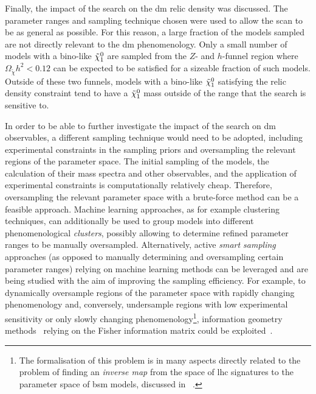 Finally, the impact of the \onelepton search on the \gls{dm} relic density was discussed. The parameter ranges and sampling technique chosen were used to allow the scan to be as general as possible. For this reason, a large fraction of the models sampled are not directly relevant to the \gls{dm} phenomenology. Only a small number of models with a bino-like $\tilde{\chi}_1^0$ are sampled from the $Z$- and $h$-funnel region where $\Omega_{\tilde{\chi}} h^2 < 0.12$ can be expected to be satisfied for a sizeable fraction of such models. Outside of these two funnels, models with a bino-like $\tilde{\chi}_1^0$ satisfying the relic density constraint tend to have a $\tilde{\chi}_1^0$ mass outside of the range that the \onelepton search is sensitive to. 

In order to be able to further investigate the impact of the \onelepton search on \gls{dm} observables, a different sampling technique would need to be adopted, including experimental constraints in the sampling priors and oversampling the relevant regions of the parameter space.
The initial sampling of the models, the calculation of their mass spectra and other observables, and the application of experimental constraints is computationally relatively cheap. Therefore, oversampling the relevant parameter space with a brute-force method can be a feasible approach.
Machine learning approaches, as for example clustering techniques, can additionally be used to group models into different phenomenological \textit{clusters}, possibly allowing to determine refined parameter ranges to be manually oversampled.
Alternatively, active \textit{smart sampling} approaches (as opposed to manually determining and oversampling certain parameter ranges) relying on machine learning methods can be leveraged and are being studied with the aim of improving the sampling efficiency. For example, to dynamically oversample regions of the parameter space with rapidly changing phenomenology and, conversely, undersample regions with low experimental sensitivity or only slowly changing phenomenology\footnote{The formalisation of this problem is in many aspects directly related to the problem of finding an \textit{inverse map} from the space of \gls{lhc} signatures to the parameter space of \gls{bsm} models, discussed in ~\cite{ArkaniHamed:2005px}.}, information geometry methods~\cite{amari1985differential-geometrical} relying on the Fisher information matrix could be exploited~\cite{information_geometry}.


